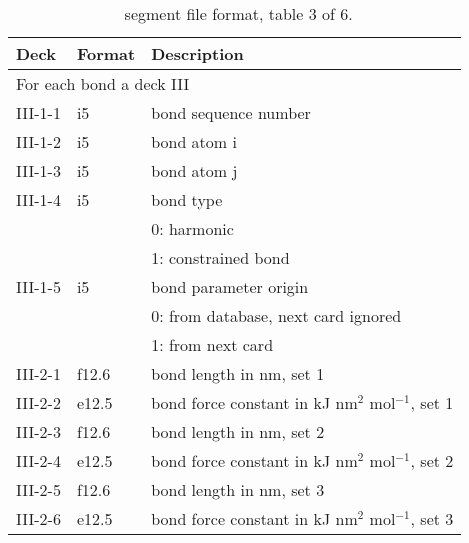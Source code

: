 \begin{table}[htbp]
\begin{center}
\begin{tabular*}{150mm}{p{12mm}p{12mm}l}
\hline\hline
Deck & Format & Description \\ \hline
\multicolumn{3}{l}{For each bond a deck III} \\
III-1-1 & i5     & bond sequence number \\
III-1-2 & i5     & bond atom i \\
III-1-3 & i5     & bond atom j \\
III-1-4 & i5     & bond type \\
        &        & 0: harmonic\\
        &        & 1: constrained bond\\
III-1-5 & i5     & bond parameter origin\\
        &        & 0: from database, next card ignored \\
        &        & 1: from next card\\
III-2-1 & f12.6  & bond length in nm, set 1\\
III-2-2 & e12.5  & bond force constant in kJ nm$^2$ mol$^{-1}$, set 1 \\
III-2-3 & f12.6  & bond length in nm, set 2\\
III-2-4 & e12.5  & bond force constant in kJ nm$^2$ mol$^{-1}$, set 2 \\
III-2-5 & f12.6  & bond length in nm, set 3\\
III-2-6 & e12.5  & bond force constant in kJ nm$^2$ mol$^{-1}$, set 3 \\
\hline
\end{tabular*}
\caption{\nwargos\ segment file format, table 3 of 6.\label{tbl:nwaseg3}}
\end{center}
\end{table}


